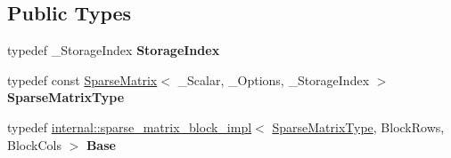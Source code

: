 \subsection*{Public Types}
\begin{DoxyCompactItemize}
\item 
\mbox{\label{class_eigen_1_1_block_impl_3_01const_01_sparse_matrix_3_01___scalar_00_01___options_00_01___store3fd33d94eaf95572721ac85ec6beb63_a9bdf06d54c99f56f497f622cebf1e865}} 
typedef \+\_\+\+Storage\+Index {\bfseries Storage\+Index}
\item 
\mbox{\label{class_eigen_1_1_block_impl_3_01const_01_sparse_matrix_3_01___scalar_00_01___options_00_01___store3fd33d94eaf95572721ac85ec6beb63_aa28cb9135bd83ed430af3e1d905df1cd}} 
typedef const \mbox{\hyperlink{class_eigen_1_1_sparse_matrix}{Sparse\+Matrix}}$<$ \+\_\+\+Scalar, \+\_\+\+Options, \+\_\+\+Storage\+Index $>$ {\bfseries Sparse\+Matrix\+Type}
\item 
\mbox{\label{class_eigen_1_1_block_impl_3_01const_01_sparse_matrix_3_01___scalar_00_01___options_00_01___store3fd33d94eaf95572721ac85ec6beb63_a5cc4672b2331279180c9af148ebfdfea}} 
typedef \mbox{\hyperlink{class_eigen_1_1internal_1_1sparse__matrix__block__impl}{internal\+::sparse\+\_\+matrix\+\_\+block\+\_\+impl}}$<$ \mbox{\hyperlink{class_eigen_1_1_sparse_matrix}{Sparse\+Matrix\+Type}}, Block\+Rows, Block\+Cols $>$ {\bfseries Base}
\end{DoxyCompactItemize}
